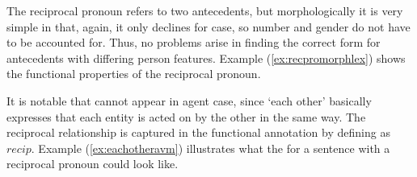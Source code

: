 The reciprocal pronoun  refers to two
antecedents, but morphologically it is very simple in that, again, it only
declines for case, so number and gender do not have to be accounted for. Thus,
no problems arise in finding the correct form for antecedents with differing
person features. Example (\ref{ex:recpromorphlex}) shows the functional
properties of the reciprocal pronoun.

\begin{morphlex}
\ex\label{ex:recpromorphlex}
\xe
\end{morphlex}

It is notable that  cannot appear in agent case, since
`each other' basically expresses that each entity is acted on by the other in
the same way. The reciprocal relationship is captured in the functional
annotation by defining \Prontype{} as $recip$. Example 
(\ref{ex:eachotheravm}) illustrates what the \Avm{} for a sentence with a
reciprocal pronoun could look like.

